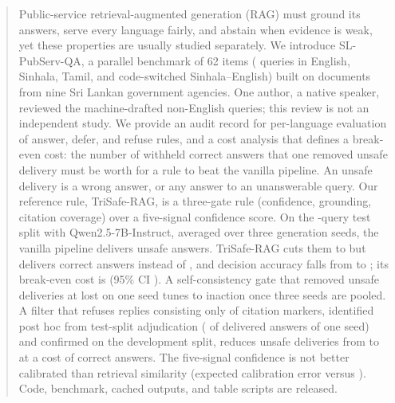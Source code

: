 
\begin{abstract}
Public-service retrieval-augmented generation (RAG) must ground its answers, serve every language fairly, and abstain when evidence is weak, yet these properties are usually studied separately. We introduce SL-PubServ-QA, a parallel benchmark of 62 items (\Lnq{} queries in English, Sinhala, Tamil, and code-switched Sinhala--English) built on documents from nine Sri Lankan government agencies. One author, a native speaker, reviewed the machine-drafted non-English queries; this review is not an independent study. We provide an audit record for per-language evaluation of answer, defer, and refuse rules, and a cost analysis that defines a break-even cost: the number of withheld correct answers that one removed unsafe delivery must be worth for a rule to beat the vanilla pipeline. An unsafe delivery is a wrong answer, or any answer to an unanswerable query. Our reference rule, TriSafe-RAG, is a three-gate rule (confidence, grounding, citation coverage) over a five-signal confidence score. On the \Lntest-query test split with Qwen2.5-7B-Instruct, averaged over three generation seeds, the vanilla pipeline delivers \LBoneUnsafe{} unsafe answers. TriSafe-RAG cuts them to \LTunUnsafe{} but delivers \LTunCorrect{} correct answers instead of \LBoneCorrect, and decision accuracy falls from \LBoneDec{} to \LTunDec; its break-even cost is \LTunBreakEven{} (95\% CI \LTunBreakEvenCI). A self-consistency gate that removed \LEsevenFixRemovedSeedZero{} unsafe deliveries at \LEsevenFixLostSeedZero{} lost on one seed tunes to inaction once three seeds are pooled. A filter that refuses replies consisting only of citation markers, identified post hoc from test-split adjudication (\LAdjEmpty{} of \LAdjN{} delivered answers of one seed) and confirmed on the development split, reduces unsafe deliveries from \LBoneUnsafe{} to \LBemptyUnsafe{} at a cost of \LBemptyLostVsBone{} correct answers. The five-signal confidence is not better calibrated than retrieval similarity (expected calibration error \LTunEce{} versus \LBoneEce). Code, benchmark, cached outputs, and table scripts are released.
\end{abstract}

